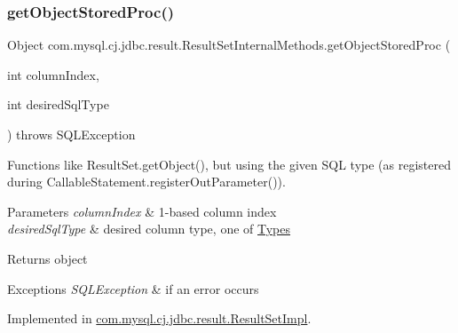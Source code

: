 \subsubsection{\texorpdfstring{get\+Object\+Stored\+Proc()}{getObjectStoredProc()}\hspace{0.1cm}{\footnotesize\ttfamily [1/4]}}
{\footnotesize\ttfamily Object com.\+mysql.\+cj.\+jdbc.\+result.\+Result\+Set\+Internal\+Methods.\+get\+Object\+Stored\+Proc (\begin{DoxyParamCaption}\item[{int}]{column\+Index,  }\item[{int}]{desired\+Sql\+Type }\end{DoxyParamCaption}) throws S\+Q\+L\+Exception}

Functions like Result\+Set.\+get\+Object(), but using the given S\+QL type (as registered during Callable\+Statement.\+register\+Out\+Parameter()).


\begin{DoxyParams}{Parameters}
{\em column\+Index} & 1-\/based column index \\
\hline
{\em desired\+Sql\+Type} & desired column type, one of \mbox{\hyperlink{}{Types}} \\
\hline
\end{DoxyParams}
\begin{DoxyReturn}{Returns}
object 
\end{DoxyReturn}

\begin{DoxyExceptions}{Exceptions}
{\em S\+Q\+L\+Exception} & if an error occurs \\
\hline
\end{DoxyExceptions}


Implemented in \mbox{\hyperlink{classcom_1_1mysql_1_1cj_1_1jdbc_1_1result_1_1_result_set_impl_a3dfdc0ed2f2b5498834ffbf5a0269e1a}{com.\+mysql.\+cj.\+jdbc.\+result.\+Result\+Set\+Impl}}.

\mbox{\label{interfacecom_1_1mysql_1_1cj_1_1jdbc_1_1result_1_1_result_set_internal_methods_ab099352f36bb8af21d47fbfebe9a515a}} 
